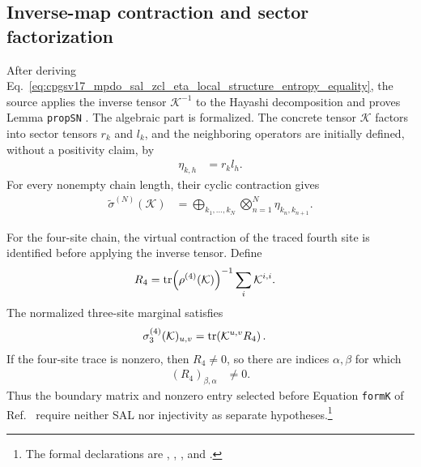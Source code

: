 \documentclass{article}
\begin{document}
\subsection{Inverse-map contraction and sector factorization}

After deriving
Eq.~\ref{eq:cpgsv17_mpdo_sal_zcl_eta_local_structure_entropy_equality}, the
source applies the inverse tensor $\mathcal K^{-1}$ to the Hayashi
decomposition and proves Lemma \texttt{propSN}
\cite[Appendix~C.2]{Cirac2016MPDO_arXiv}. The algebraic part is formalized.
The concrete tensor $\mathcal K$ factors into sector tensors $r_k$ and $l_k$,
and the neighboring operators are initially defined, without a positivity
claim, by
\begin{align}
    \eta_{k,h}
        &=r_k l_h.
    \label{eq:cpgsv17_mpdo_sal_zcl_eta_local_structure_raw_neighbor_operator}
\end{align}
For every nonempty chain length, their cyclic contraction gives
\begin{align}
    \widetilde{\sigma}^{(N)}(\mathcal K)
        &=
        \bigoplus_{k_1,\ldots,k_N}
        \bigotimes_{n=1}^{N}\eta_{k_n,k_{n+1}}.
    \label{eq:cpgsv17_mpdo_sal_zcl_eta_local_structure_raw_cyclic_factorization}
\end{align}

For the four-site chain, the virtual contraction of the traced fourth site is
identified before applying the inverse tensor. Define
\begin{align}
    R_4
        &=
        \operatorname{tr}\!\left(\rho^{(4)}(\mathcal K)\right)^{-1}
        \sum_i \mathcal K^{i,i}.
    \label{eq:cpgsv17_mpdo_sal_zcl_eta_local_structure_normalized_four_site_tail}
\end{align}
The normalized three-site marginal satisfies
\begin{align}
    \sigma_3^{(4)}(\mathcal K)_{u,v}
        &=
        \operatorname{tr}\!\left(\mathcal K^{u,v}R_4\right).
    \label{eq:cpgsv17_mpdo_sal_zcl_eta_local_structure_four_site_marginal_closure}
\end{align}
If the four-site trace is nonzero, then $R_4\neq 0$, so there are indices
$\alpha,\beta$ for which
\begin{align}
    (R_4)_{\beta,\alpha}
        &\neq 0.
    \label{eq:cpgsv17_mpdo_sal_zcl_eta_local_structure_nonzero_tail_entry}
\end{align}
Thus the boundary matrix and nonzero entry selected before Equation
\texttt{formK} of Ref.~\cite{Cirac2016MPDO_arXiv} require neither SAL nor
injectivity as separate hypotheses.\footnote{The formal declarations are
,
,
, and
.}
\end{document}
